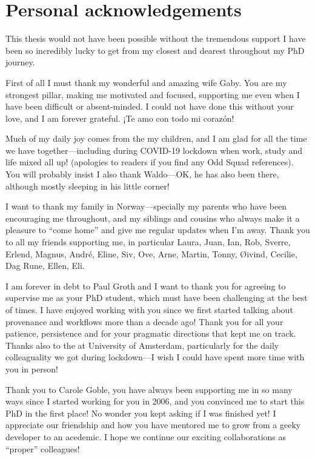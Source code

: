 \label{ch11:acknowledgements}

\section{Personal acknowledgements}\label{personal-acknowledgements}

This thesis would not have been possible without the tremendous support I have been so incredibly lucky to get from my closest and dearest throughout my PhD journey.

First of all I must thank my wonderful and amazing wife Gaby. You are my strongest pillar, making me motivated and focused, supporting me even when I have been difficult or absent-minded. I could not have done this without your love, and I am forever grateful. ¡Te amo con todo mi corazón! 

Much of my daily joy comes from the my children,
and I am glad for all the time we have together---including during COVID-19 lockdown when work, study and life mixed all up! (apologies to readers if you find any Odd Squad references). You will probably insist I also thank Waldo---OK, he has also been there, although mostly sleeping in his little corner!

I want to thank my family in Norway---specially my parents who have been encouraging me throughout, and my siblings and cousins who always make it a pleasure to ``come home'' and give me regular updates when I'm away.  Thank you to all my friends supporting me, in particular Laura, Juan, Ian, Rob, Sverre, Erlend, Magnus, André, Eline, Siv, Ove, Arne, Martin, Tonny, Øivind, Cecilie, Dag Rune, Ellen, Eli.

I am forever in debt to Paul Groth and I want to thank you for agreeing to supervise me as your PhD student, which must have been challenging at the best of times. 
I have enjoyed working with you since we first started talking about provenance and workflows more than a decade ago! Thank you for all your patience, persistence and for your pragmatic directions that kept me on track. Thanks also to the  at University of Amsterdam, particularly for the daily colleaguality we got during lockdown---I wish I could have spent more time with you in person!

Thank you to Carole Goble, you have always been supporting me in so many ways since I started working for you in 2006, and you convinced me to start this PhD in the first place! No wonder you kept asking if I was finished yet! I appreciate our friendship and how you have mentored me to grow from a geeky developer to an acedemic. I hope we continue our exciting collaborations as ``proper'' colleagues!

